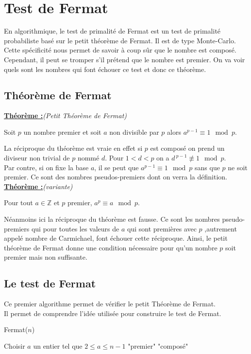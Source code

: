 \section{Test de Fermat}
En algorithmique, le test de primalité de Fermat est un test de primalité probabiliste basé sur le petit théorème de Fermat. 
Il est de type Monte-Carlo. Cette spécificité nous permet de savoir à coup sûr que le nombre est composé.
Cependant, il peut se tromper s'il prétend que le nombre est premier. On va voir quels sont les nombres qui font échouer ce test et donc ce théorème.
\clearpage
\subsection{Théorème de Fermat} 

\underline{\textbf{Théorème :}}\textit{(Petit Théorème de Fermat)}
\begin{center}
    Soit $p$ un nombre premier et soit $a$ non divisible par $p$ alors $a^{p-1} \equiv 1 \mod p$.
\end{center}
La réciproque du théorème est vraie en effet si $p$ est composé on prend un diviseur non trivial de $p$ nommé $d$. Pour $1<d<p$ on a  $d^{\ p-1} \not \equiv 1 \mod p$.\\
Par contre, si on fixe la base $a$, il se peut que $a^{p-1}\equiv 1\mod p$ sans que $p$ ne soit premier. Ce sont des nombres pseudos-premiers dont on verra la définition.\\

\underline{\textbf{Théorème :}}\textit{(variante)}

\begin{center}
    Pour tout $a \in \mathbb{Z} $ et $p$ premier, $a^{p} \equiv a \mod p$.
\end{center}
Néanmoins ici la réciproque du théorème est fausse. Ce sont les nombres pseudo-premiers qui pour toutes les valeurs de $a$ qui sont premières avec $p$ ,autrement appelé nombre de Carmichael, font échouer cette réciproque. Ainsi, le petit théorème de Fermat donne une condition nécessaire pour qu'un nombre $p$ soit premier mais non suffisante. 
\subsection{Le test de Fermat} 
Ce premier algorithme permet de vérifier le petit Théorème de Fermat.\\
Il permet de comprendre l'idée utilisée pour construire le test de Fermat.
\begin{algorithm}[h!]
\caption{Fermat($n$)}
\begin{algorithmic}[1]
 
\State Choisir $a$ un entier tel que $2\leq a \leq n-1$
 \Return "premier"
\EndIf
\State \Return "composé"
\end{algorithmic}
\end{algorithm}

